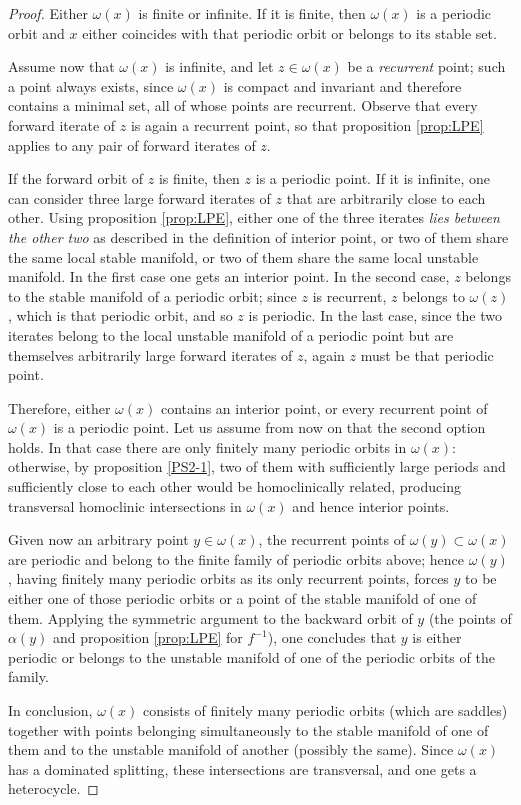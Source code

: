 \documentclass[a4paper,11pt]{article}
\theoremstyle{definition}
\begin{document}
\begin{proof}
Either $\omega(x)$ is finite or infinite. If it is finite, then $\omega(x)$
is a periodic orbit and $x$ either coincides with that periodic orbit or
belongs to its stable set.

Assume now that $\omega(x)$ is infinite, and let $z\in\omega(x)$ be a
\emph{recurrent} point; such a point always exists, since $\omega(x)$ is
compact and invariant and therefore contains a minimal set, all of whose
points are recurrent. Observe that every forward iterate of $z$ is again a
recurrent point, so that proposition \ref{prop:LPE} applies to any pair of
forward iterates of $z$.

If the forward orbit of $z$ is finite, then $z$ is a periodic point. If it
is infinite, one can consider three large forward iterates of $z$ that are
arbitrarily close to each other. Using proposition \ref{prop:LPE}, either
one of the three iterates \emph{lies between the other two} as described in
the definition of interior point, or two of them share the same local stable
manifold, or two of them share the same local unstable manifold. In the
first case one gets an interior point. In the second case, $z$ belongs to
the stable manifold of a periodic orbit; since $z$ is recurrent, $z$ belongs
to $\omega(z)$, which is that periodic orbit, and so $z$ is periodic. In the
last case, since the two iterates belong to the local unstable manifold of a
periodic point but are themselves arbitrarily large forward iterates of $z$,
again $z$ must be that periodic point.

Therefore, either $\omega(x)$ contains an interior point, or every recurrent
point of $\omega(x)$ is a periodic point. Let us assume from now on that the
second option holds. In that case there are only finitely many periodic
orbits in $\omega(x)$: otherwise, by proposition \ref{PS2-1}, two of them
with sufficiently large periods and sufficiently close to each other would
be homoclinically related, producing transversal homoclinic intersections in
$\omega(x)$ and hence interior points.

Given now an arbitrary point $y\in\omega(x)$, the recurrent points of
$\omega(y)\subset \omega(x)$ are periodic and belong to the finite family of
periodic orbits above; hence $\omega(y)$, having finitely many periodic
orbits as its only recurrent points, forces $y$ to be either one of those
periodic orbits or a point of the stable manifold of one of them. Applying
the symmetric argument to the backward orbit of $y$ (the points of
$\alpha(y)$ and proposition \ref{prop:LPE} for $f^{-1}$), one concludes that
$y$ is either periodic or belongs to the unstable manifold of one of the
periodic orbits of the family.

In conclusion, $\omega(x)$ consists of finitely many periodic orbits (which
are saddles) together with points belonging simultaneously to the stable
manifold of one of them and to the unstable manifold of another (possibly
the same). Since $\omega(x)$ has a dominated splitting, these intersections
are transversal, and one gets a heterocycle.
\end{proof}
\end{document}

